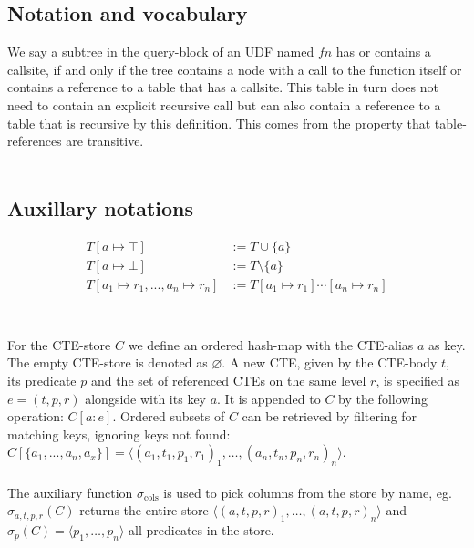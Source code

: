 
\subsection{Notation and vocabulary}
We say a subtree in the query-block of an UDF named $fn$ has or contains a callsite, if and only if the tree contains a node with a call to the function itself or contains a reference to a table that has a callsite. This table in turn does not need to contain an explicit recursive call but can also contain a reference to a table that is recursive by this definition. This comes from the property that table-references are transitive.
\\\\
\subsection{Auxillary notations}
\begin{align*}
    T[a \mapsto \top] &:= T \cup \{a\}\\
    T[a \mapsto \bot] &:= T \setminus \{a\}\\
    T[a_1 \mapsto r_1, ..., a_n \mapsto r_n] &:= T[a_1 \mapsto r_1] \cdots[a_n \mapsto r_n]\\
\end{align*}
\\\\
For the CTE-store $C$ we define an ordered hash-map with the CTE-alias $a$ as key. The empty CTE-store is denoted as $\varnothing$. A new CTE, given by the CTE-body $t$, its predicate $p$ and the set of referenced CTEs on the same level $r$, is specified as $e=(t, p, r)$ alongside with its key $a$. It is appended to $C$ by the following operation: $C[a: e]$. Ordered subsets of $C$ can be retrieved by filtering for matching keys, ignoring keys not found: $C[\{a_1, ..., a_n, a_x\}] = \langle (a_1, t_1, p_1, r_1)_1, \dots, (a_n, t_n, p_n, r_n)_n\rangle$.
\\\\
The auxiliary function $\sigma_{\text{cols}}$ is used to pick columns from the store by name, eg. $\sigma_{a, t, p, r}(C)$ returns the entire store $\langle (a, t, p, r)_1, \dots, (a, t, p, r)_n \rangle$ and $\sigma_p(C) = \langle p_1, \dots, p_n \rangle$ all predicates in the store.
\\\\


